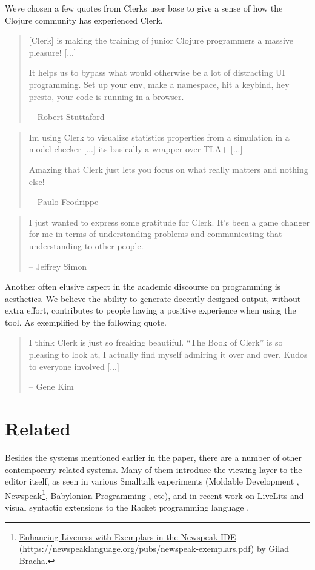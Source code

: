 \documentclass[sigconf,screen]{acmart}
\begin{document}
We\textquotesingle ve chosen a few quotes from Clerk\textquotesingle s user base to give a sense of how the Clojure community has experienced Clerk.

\begin{quote}
{[}Clerk{]} is making the training of junior Clojure programmers a massive pleasure! {[}...{]}

It helps us to bypass what would otherwise be a lot of distracting UI programming. Set up your env, make a namespace, hit a keybind, hey presto, your code is running in a browser.

--~Robert Stuttaford
\end{quote}

\begin{quote}
I\textquotesingle m using Clerk to visualize statistics properties from a simulation in a model checker {[}...{]} it\textquotesingle s basically a wrapper over TLA+ {[}...{]}

Amazing that Clerk just lets you focus on what really matters and nothing else!

--~Paulo Feodrippe
\end{quote}

\begin{quote}
I just wanted to express some gratitude for Clerk. It's been a game changer for me in terms of understanding problems and communicating that understanding to other people.

-- Jeffrey Simon
\end{quote}

Another often elusive aspect in the academic discourse on programming is aesthetics. We believe the ability to generate decently designed output, without extra effort, contributes to  people having a positive experience when using the tool. As exemplified by the following quote.

\begin{quote}
I think Clerk is just so freaking beautiful. ``The Book of Clerk'' is so pleasing to look at, I actually find myself admiring it over and over. Kudos to everyone involved {[}...{]}

-- Gene Kim
\end{quote}

\hypertarget{related}{%
\section{Related}\label{related}}

Besides the systems mentioned earlier in the paper, there are a number of other contemporary related systems. Many of them introduce the viewing layer to the editor itself, as seen in various Smalltalk experiments (Moldable Development \cite{Chi__2015},  Newspeak\footnote{{\href{https://newspeaklanguage.org/pubs/newspeak-exemplars.pdf}{Enhancing Liveness with Exemplars in the Newspeak IDE} (https://newspeaklanguage.org/pubs/newspeak-exemplars.pdf)} by Gilad Bracha.},  Babylonian Programming \cite{Rauch_2019}, etc), and in recent work on LiveLits \cite{Omar_2021} and visual syntactic extensions to the Racket programming language \cite{Andersen_2020}.
\end{document}
